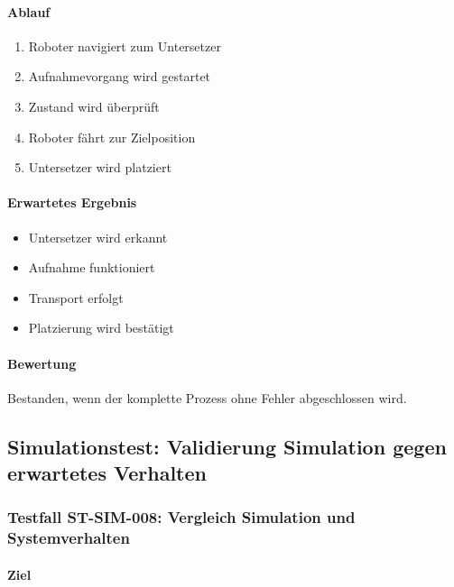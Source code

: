 \documentclass[
  a4paper,
  12pt,
  DIV=12,        %
  parskip=half,  %
  headings=small %
]{scrartcl}
\theoremstyle{definition}
\providecommand{\tightlist}{%
  \setlength{\itemsep}{0pt}\setlength{\parskip}{0pt}}
\theoremstyle{definition}
\begin{document}
\paragraph{Ablauf}\label{ablauf-22}

\begin{enumerate}
\def\labelenumi{\arabic{enumi}.}
\tightlist
\item
  Roboter navigiert zum Untersetzer
\item
  Aufnahmevorgang wird gestartet
\item
  Zustand wird überprüft
\item
  Roboter fährt zur Zielposition
\item
  Untersetzer wird platziert
\end{enumerate}

\paragraph{Erwartetes Ergebnis}\label{erwartetes-ergebnis-22}

\begin{itemize}
\tightlist
\item
  Untersetzer wird erkannt
\item
  Aufnahme funktioniert
\item
  Transport erfolgt
\item
  Platzierung wird bestätigt
\end{itemize}

\paragraph{Bewertung}\label{bewertung-22}

Bestanden, wenn der komplette Prozess ohne Fehler abgeschlossen wird.

\subsection{Simulationstest: Validierung Simulation gegen erwartetes
Verhalten}\label{simulationstest-validierung-simulation-gegen-erwartetes-verhalten}

\subsubsection{Testfall ST-SIM-008: Vergleich Simulation und
Systemverhalten}\label{testfall-st-sim-008-vergleich-simulation-und-systemverhalten}

\paragraph{Ziel}\label{ziel-23}
\end{document}
